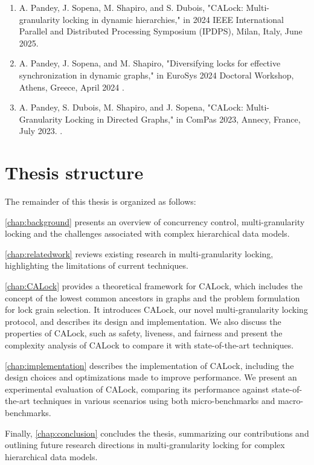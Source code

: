 \begin{enumerate}
    \item A. Pandey, J. Sopena, M. Shapiro, and S. Dubois, "CALock: Multi-granularity locking in dynamic hierarchies," in 2024 IEEE International Parallel and Distributed Processing Symposium (IPDPS), Milan, Italy, June 2025.
    \item A. Pandey, J. Sopena, and M. Shapiro, "Diversifying locks for effective synchronization in dynamic graphs," in EuroSys 2024 Doctoral Workshop, Athens, Greece, April 2024 \href{https://inria.hal.science/hal-04851918}{}.
    \item A. Pandey, S. Dubois, M. Shapiro, and J. Sopena, "CALock: Multi-Granularity Locking in Directed Graphs," in ComPas 2023, Annecy, France, July 2023. \href{https://hal.sorbonne-universite.fr/hal-04851841}{}. 
\end{enumerate}

\section*{Thesis structure}
The remainder of this thesis is organized as follows:

 \cref{chap:background} presents an overview of concurrency control, multi-granularity locking and the challenges associated with complex hierarchical data models. 

 \cref{chap:relatedwork} reviews existing research in multi-granularity locking, highlighting the limitations of current techniques. 

 \cref{chap:CALock} provides a theoretical framework for CALock, which includes the concept of the lowest common ancestors in graphs and the problem formulation for lock grain selection. It introduces CALock, our novel multi-granularity locking protocol, and describes its design and implementation. We also discuss the properties of CALock, such as safety, liveness, and fairness and present the complexity analysis of CALock to compare it with state-of-the-art techniques.

 \cref{chap:implementation} describes the implementation of CALock, including the design choices and optimizations made to improve performance. We present an experimental evaluation of CALock, comparing its performance against state-of-the-art techniques in various scenarios using both micro-benchmarks and macro-benchmarks.
 
 Finally, \cref{chap:conclusion} concludes the thesis, summarizing our contributions and outlining future research directions in multi-granularity locking for complex hierarchical data models.
